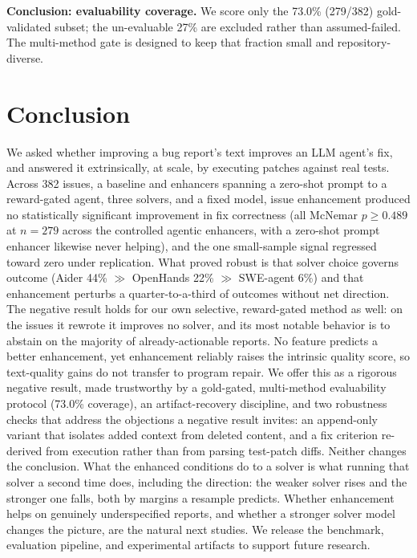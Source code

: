 \documentclass[journal]{IEEEtran}
\begin{document}
\textbf{Conclusion: evaluability coverage.} We score only the 73.0\% (279/382) gold-validated subset; the un-evaluable 27\% are excluded rather than assumed-failed. The multi-method gate is designed to keep that fraction small and repository-diverse.

\section{Conclusion}
\label{sec:conclusion}

We asked whether improving a bug report's text improves an LLM agent's fix, and answered it extrinsically, at scale, by executing patches against real tests. Across 382 issues, a baseline and enhancers spanning a zero-shot prompt to a reward-gated agent, three solvers, and a fixed model, issue enhancement produced no statistically significant improvement in fix correctness (all McNemar $p \ge 0.489$ at $n=279$ across the controlled agentic enhancers, with a zero-shot prompt enhancer likewise never helping), and the one small-sample signal regressed toward zero under replication. What proved robust is that solver choice governs outcome (Aider 44\% $\gg$ OpenHands 22\% $\gg$ SWE-agent 6\%) and that enhancement perturbs a quarter-to-a-third of outcomes without net direction. The negative result holds for our own selective, reward-gated method as well: on the issues it rewrote it improves no solver, and its most notable behavior is to abstain on the majority of already-actionable reports. No feature predicts a better enhancement, yet enhancement reliably raises the intrinsic quality score, so text-quality gains do not transfer to program repair. We offer this as a rigorous negative result, made trustworthy by a gold-gated, multi-method evaluability protocol (73.0\% coverage), an artifact-recovery discipline, and two robustness checks that address the objections a negative result invites: an append-only variant that isolates added context from deleted content, and a fix criterion re-derived from execution rather than from parsing test-patch diffs. Neither changes the conclusion. What the enhanced conditions do to a solver is what running that solver a second time does, including the direction: the weaker solver rises and the stronger one falls, both by margins a resample predicts. Whether enhancement helps on genuinely underspecified reports, and whether a stronger solver model changes the picture, are the natural next studies. We release the benchmark, evaluation pipeline, and experimental artifacts to support future research.
\end{document}
